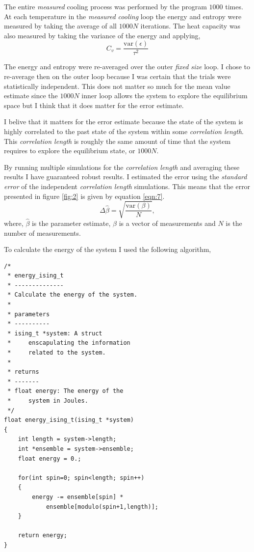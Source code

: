 \documentclass[a4paper, twocolumn]{article}
\begin{document}
The entire \emph{measured} cooling process was performed %
by the program \(1000\) times. At each temperature in the %
\emph{measured cooling} loop the energy and entropy %
were measured by taking the average of all \(1000 N\) %
iterations. The heat capacity was also measured by taking %
the variance of the energy and applying,
%
\begin{equation}
    C_{v} = \frac{\textrm{var}(\epsilon)}{\tau^{2}}
    \label{eqn:6}
\end{equation}


The energy and entropy were re-averaged over the outer %
\emph{fixed size} loop. I chose to re-average then on %
the outer loop because I was certain that the trials were %
statistically independent. This does not matter so much %
for the mean value estimate since the \(1000N\) inner %
loop allows the system to explore the equilibrium space %
but I think that it does matter for the error estimate. 


I belive that it matters for the error estimate because %
the state of the system is highly correlated to the %
past state of the system within some \emph{correlation %
length}. This \emph{correlation length} is roughly the %
same amount of time that the system requires to explore %
the equilibrium state, or \(1000N\).


By running multiple simulations for the \emph{correlation %
length} and averaging these results I have guaranteed %
robust results. I estimated the error using the \emph{standard %
error} of the independent \emph{correlation length} simulations. %
This means that the error presented in figure \ref{fig:2} is %
given by equation \ref{eqn:7}.
%
\begin{equation}
    \Delta\hat{\beta} = \sqrt{\frac{\textrm{var}(\beta)}{N}},
    \label{eqn:7}
\end{equation}
%
where, \(\hat{\beta}\) is the parameter estimate, \(\beta\) is a %
vector of measurements and \(N\) is the number of measurements. 


To calculate the energy of the system I used the following %
algorithm, 

\begin{lstlisting}
/*
 * energy_ising_t
 * --------------
 * Calculate the energy of the system.
 *
 * parameters
 * ----------
 * ising_t *system: A struct 
 *     enscapulating the information 
 *     related to the system. 
 *
 * returns
 * -------
 * float energy: The energy of the
 *     system in Joules. 
 */
float energy_ising_t(ising_t *system)
{
    int length = system->length;
    int *ensemble = system->ensemble;
    float energy = 0.;

    for(int spin=0; spin<length; spin++)
    {
        energy -= ensemble[spin] *  
            ensemble[modulo(spin+1,length)];
    }

    return energy;
}
\end{lstlisting}
\end{document}
